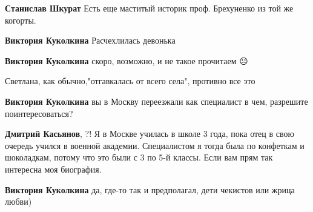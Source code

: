 \begin{itemize}
\begin{itemize}
\textbf{Станислав Шкурат} Есть еще маститый историк проф. Брехуненко из той же когорты.

 
\textbf{Виктория Куколкина} Расчехлилась девонька

 
\textbf{Виктория Куколкина} скоро, возможно, и не такое прочитаем ☹️

 
Светлана, как обычно,"отгавкалась от всего села", противно все это

 
\textbf{Виктория Куколкина} вы в Москву переезжали как специалист в чем, разрешите поинтересоваться?

 
\textbf{Дмитрий Касьянов}, ?! Я в Москве училась в школе 3 года, пока отец в свою очередь учился в военной академии. Специалистом я тогда была по конфеткам и шоколадкам, потому что это были с 3 по 5-й классы. Если вам прям так интересна моя биография.

 
\textbf{Виктория Куколкина} да, где-то так и предполагал, дети чекистов или жрица любви)


\end{itemize}
\end{itemize}
